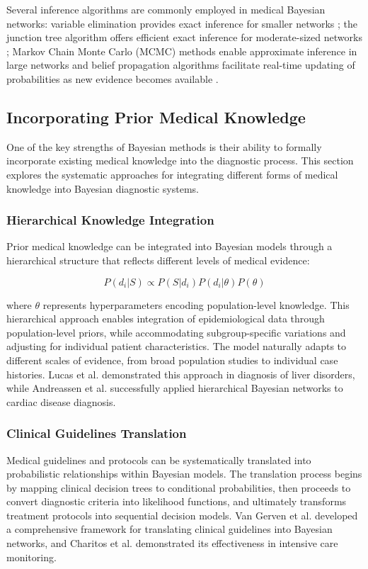 \documentclass[3p,times,procedia]{elsarticle}
\begin{document}
Several inference algorithms are commonly employed in medical Bayesian networks:
variable elimination provides exact inference for smaller networks \cite{Zhang1996Exploiting};
the junction tree algorithm offers efficient exact inference for moderate-sized networks
\cite{Lauritzen1988Local}; Markov Chain Monte Carlo (MCMC) methods enable approximate
inference in large networks \cite{Neal1993Probabilistic} and belief propagation algorithms
facilitate real-time updating of probabilities as new evidence becomes available
\cite{Pearl1982Reverend}.

\subsection{Incorporating Prior Medical Knowledge}
One of the key strengths of Bayesian methods is their ability to formally incorporate
existing medical knowledge into the diagnostic process. This section explores the
systematic approaches for integrating different forms of medical knowledge into
Bayesian diagnostic systems.

\subsubsection{Hierarchical Knowledge Integration}
Prior medical knowledge can be integrated into Bayesian models through a hierarchical
structure that reflects different levels of medical evidence:

\begin{equation}
P(d_i|S) \propto P(S|d_i)P(d_i|\theta)P(\theta)
\end{equation}

where $\theta$ represents hyperparameters encoding population-level knowledge. This
hierarchical approach enables integration of epidemiological data through population-level
priors, while accommodating subgroup-specific variations and adjusting for individual
patient characteristics. The model naturally adapts to different scales of evidence,
from broad population studies to individual case histories. Lucas et al. \cite{Lucas2004} demonstrated
this approach in diagnosis of liver disorders, while Andreassen et al. \cite{Andreassen1999} successfully
applied hierarchical Bayesian networks to cardiac disease diagnosis.

\subsubsection{Clinical Guidelines Translation}
Medical guidelines and protocols can be systematically translated into probabilistic
relationships within Bayesian models. The translation process begins by mapping clinical
decision trees to conditional probabilities, then proceeds to convert diagnostic criteria
into likelihood functions, and ultimately transforms treatment protocols into sequential
decision models. Van Gerven et al. \cite{VanGerven2008} developed a comprehensive framework for translating
clinical guidelines into Bayesian networks, and Charitos et al. \cite{Charitos2009} demonstrated its
effectiveness in intensive care monitoring.
\end{document}
